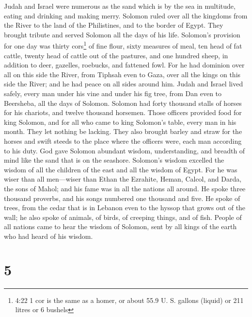  Judah and Israel were numerous as the sand which is by the
sea in multitude, eating and drinking and making merry. 
Solomon ruled over all the kingdoms from the River to the land of the
Philistines, and to the border of Egypt. They brought tribute and served
Solomon all the days of his life.  Solomon's provision for
one day was thirty cors\footnote{4:22 1 cor is the same as a homer, or
  about 55.9 U. S. gallons (liquid) or 211 litres or 6 bushels} of fine
flour, sixty measures of meal,  ten head of fat cattle,
twenty head of cattle out of the pastures, and one hundred sheep, in
addition to deer, gazelles, roebucks, and fattened fowl. 
For he had dominion over all on this side the River, from Tiphsah even
to Gaza, over all the kings on this side the River; and he had peace on
all sides around him.  Judah and Israel lived safely, every
man under his vine and under his fig tree, from Dan even to Beersheba,
all the days of Solomon.  Solomon had forty thousand stalls
of horses for his chariots, and twelve thousand horsemen. 
Those officers provided food for king Solomon, and for all who came to
king Solomon's table, every man in his month. They let nothing be
lacking.  They also brought barley and straw for the horses
and swift steeds to the place where the officers were, each man
according to his duty.  God gave Solomon abundant wisdom,
understanding, and breadth of mind like the sand that is on the
seashore.  Solomon's wisdom excelled the wisdom of all the
children of the east and all the wisdom of Egypt.  For he
was wiser than all men---wiser than Ethan the Ezrahite, Heman, Calcol,
and Darda, the sons of Mahol; and his fame was in all the nations all
around.  He spoke three thousand proverbs, and his songs
numbered one thousand and five.  He spoke of trees, from
the cedar that is in Lebanon even to the hyssop that grows out of the
wall; he also spoke of animals, of birds, of creeping things, and of
fish.  People of all nations came to hear the wisdom of
Solomon, sent by all kings of the earth who had heard of his wisdom.

\hypertarget{section-4}{%
\section{5}\label{section-4}}

